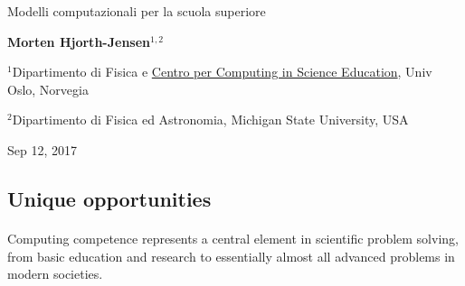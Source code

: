 \documentclass[%
oneside,                 %
final,                   %
10pt]{article}
\begin{document}

\newcommand{\exercisesection}[1]{\subsection*{#1}}






\thispagestyle{empty}

\begin{center}
{\LARGE\bf
\begin{spacing}{1.25}
Modelli computazionali per la scuola superiore
\end{spacing}
}
\end{center}


\begin{center}
{\bf Morten Hjorth-Jensen${}^{1, 2}$} \\ [0mm]
\end{center}

\begin{center}
\centerline{{\small ${}^1$Dipartimento di Fisica e \href{{http://www.mn.uio.no/ccse/english/people/index.html}}{Centro per Computing in Science Education}, Univ Oslo, Norvegia}}
\centerline{{\small ${}^2$Dipartimento di Fisica ed Astronomia, Michigan State University, USA}}
\end{center}
    

\begin{center}
Sep 12, 2017
\end{center}

\vspace{1cm}


\subsection{Unique opportunities}

\paragraph{}
Computing competence represents a central element
in scientific problem solving, from basic education and research to
essentially almost all advanced problems in modern
societies.
\end{document}
